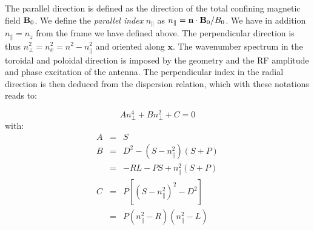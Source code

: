 The parallel direction is defined as the direction of the total confining magnetic field ${\mathbf B}_0$. We define the \textit{parallel index} $n_\parallel$ as $n_\parallel = \mathbf{n}\cdot{\mathbf B}_0/B_0$. We have in addition $n_{\parallel}=n_{z}$ from the frame we have defined above. The perpendicular direction is thus $n_{\perp}^{2}=n_{x}^{2}=n^{2}-n_{\parallel}^{2}$ and oriented along $\mathbf{x}$. The wavenumber spectrum in the toroidal and poloidal direction is imposed by the geometry and the RF amplitude and phase excitation of the antenna. The perpendicular index in the radial direction is then deduced from the dispersion relation, which with these notations reads to:

\begin{equation}
A n_{\perp}^{4} + B n_{\perp}^{2} + C = 0
\label{eq:cold_plasma_dispersion_relation_n_perp}
\end{equation}
with:
\begin{subequations}
	\begin{eqnarray}
		A & = & S\\
		B & = & D^2 - (S - n_\parallel^2)(S + P)\\
		  & = & -RL - PS + n_{\parallel}^{2}(S+P) \nonumber \\
		C & = & P[(S - n_{\parallel}^{2})^{2} - D^2] \\
		  & = & P(n_\parallel^2 - R)(n_\parallel^2 - L) \nonumber
		\end{eqnarray}
		\label{eq:cold_plasma_dispersion_relation_n_perp_ABC}
\end{subequations}

